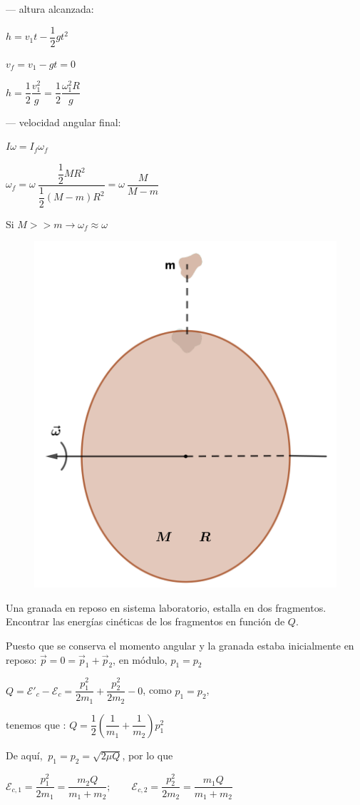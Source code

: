 \begin{multicols}{2}
--- altura alcanzada:

$h=v_1t-\dfrac 1 2 g t^2$

$v_f=v_1-gt=0$

$h=\dfrac 1 2 \dfrac{v_1^2}{g}=\dfrac 1 2 \dfrac{\omega_1^2 R}{g}$

--- velocidad angular final:

$I\omega=I_f \omega_f$

$\omega_f=\omega\  \dfrac{\dfrac 1 2 MR^2}{\dfrac 1 2 (M-m)R^2}=\omega \  \dfrac{M}{M-m}$

Si $M>>m \to \omega_f \approx \omega$
\begin{figure}[H]
	\centering
	\includegraphics[width=.55\textwidth]{imagenes/imagenes17/T17IM11.png}
	\end{figure}	
\end{multicols}

\begin{prob}
Una granada en reposo en sistema laboratorio, estalla en dos fragmentos. Encontrar las energías cinéticas de los fragmentos en función de $Q$.	
\end{prob}

Puesto que se conserva el momento angular y la granada estaba inicialmente en reposo:
$\vec p=0=\vec p_1+\vec p_2$, en módulo, $p_1=p_2$

$Q=\mathcal E'_c-\mathcal E_c=\dfrac{p_1^2}{2m_1}+\dfrac{p_2^2}{2m_2}-0$, como $p_1=p_2$, 

tenemos que : $Q=\dfrac 1 2 \left( \dfrac 1 {m_1}+\dfrac 1{m_2} \right)p_1^2$

De aquí, $\ p_1=p_2=\sqrt{2\mu Q}$, por lo que 

$\mathcal E_{c,1}=\dfrac{p_1^2}{2m_1}=\dfrac{m_2Q}{m_1+m_2}; \qquad \mathcal E_{c,2}=\dfrac{p_2^2}{2m_2}=\dfrac{m_1Q}{m_1+m_2}$


